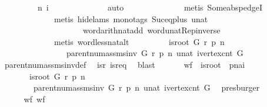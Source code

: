 \begin{isabellebody}
\ \ \ \ \ \ \ \ \ n\ {\isacharquery}i\ {\isasymnoteq}\ {}{\isachardoublequoteclose}\ \isanewline
\ \ \ \ \ \ \ \ \ \isamarkupfalse%
\ {\isacharparenleft}auto{\isacharcomma}\ \isanewline
\ \ \ \ \ \ \ \ \ \ \ \ \ metis\ Some{\isacharunderscore}abs{\isacharunderscore}pedgeI{\isacharcomma}\ \isanewline
\ \ \ \ \ \ \ \ \ \ \ \ \ metis\ {\isacharparenleft}hide{\isacharunderscore}lams{\isacharcomma}\ mono{\isacharunderscore}tags{\isacharparenright}\ Suc{\isacharunderscore}eq{\isacharunderscore}plus{}\ unat{\isacharunderscore}{}\ \isanewline
\ \ \ \ \ \ \ \ \ \ \ \ \ \ \ \ \ \ \ \ word{\isacharunderscore}arith{\isacharunderscore}nat{\isacharunderscore}add\ word{\isacharunderscore}unat{\isachardot}Rep{\isacharunderscore}inverse{\isacharcomma}\isanewline
\ \ \ \ \ \ \ \ \ \ \ \ \ metis\ word{\isacharunderscore}less{\isacharunderscore}nat{\isacharunderscore}alt{\isacharparenright}\isanewline
\ \ \ \ \isacommand{{\isacharbraceright}}\isamarkupfalse%
\ \isamarkupfalse%
\ \isamarkupfalse%
\ {\isachardoublequoteopen}is{\isacharunderscore}root\ G\ r\ p\ n\ {\isasymand}\isanewline
\ \ \ \ \ \ \ \ \ \ \ \ \ \ \ \ parent{\isacharunderscore}num{\isacharunderscore}assms{\isacharunderscore}inv\ G\ r\ p\ n\ {\isacharparenleft}unat\ {\isacharparenleft}ivertex{\isacharunderscore}cnt\ G{\isacharparenright}{\isacharparenright}{\isachardoublequoteclose}\isanewline
\ \ \ \ \isamarkupfalse%
\ parent{\isacharunderscore}num{\isacharunderscore}assms{\isacharunderscore}inv{\isacharunderscore}def\ \isamarkupfalse%
\ isr\ isr{\isacharunderscore}eq\ \isamarkupfalse%
\ blast\isanewline
\ \ \isacommand{{\isacharbraceright}}\isamarkupfalse%
\isanewline
\ \ \isamarkupfalse%
\ {\isachardoublequoteopen}{\isacharquery}wf\ {\isasymand}\ {\isacharquery}is{\isacharunderscore}root\ {\isasymand}\ {\isacharquery}pnai\isanewline
\ \ \ \ \ \ {\isasymLongrightarrow}\ is{\isacharunderscore}root\ G\ r\ p\ n\ {\isasymand}\ \isanewline
\ \ \ \ \ \ \ \ parent{\isacharunderscore}num{\isacharunderscore}assms{\isacharunderscore}inv\ G\ r\ p\ n\ {\isacharparenleft}unat\ {\isacharparenleft}ivertex{\isacharunderscore}cnt\ G{\isacharparenright}{\isacharparenright}{\isachardoublequoteclose}\ \isamarkupfalse%
\ presburger\isanewline
\ \ \isamarkupfalse%
\isanewline
\ \ \isacommand{{\isacharbraceleft}}\isamarkupfalse%
\isanewline
\ \ \ \ \isamarkupfalse%
\ wf{\isacharcolon}\ {\isachardoublequoteopen}{\isacharquery}wf{\isachardoublequoteclose}\isanewline

\end{isabellebody}
